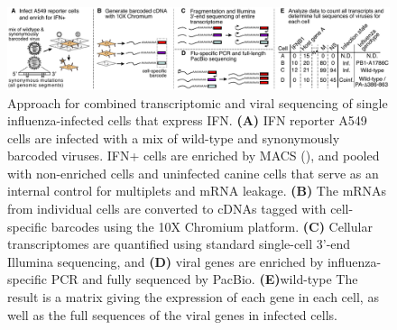 \documentclass[9pt,lineno]{elife}
\begin{document}
\begin{figure}
\begin{fullwidth}

\includegraphics[width=\linewidth, valign=t]{figures/WorkflowSchematic/SchematicForPaper.pdf}

\caption{
Approach for combined transcriptomic and viral sequencing of single influenza-infected cells that express IFN.
{\bf (A)}
IFN reporter A549 cells are infected with a mix of wild-type and synonymously barcoded viruses.
IFN+ cells are enriched by MACS (), and pooled with non-enriched cells and uninfected canine cells that serve as an internal control for multiplets and mRNA leakage.
{\bf (B)}
The mRNAs from individual cells are converted to cDNAs tagged with cell-specific barcodes using the 10X Chromium platform.
{\bf (C)}
Cellular transcriptomes are quantified using standard single-cell 3'-end Illumina sequencing, and 
{\bf (D)}
viral genes are enriched by influenza-specific PCR and fully sequenced by PacBio.
{\bf (E)}wild-type
The result is a matrix giving the expression of each gene in each cell, as well as the full sequences of the viral genes in infected cells.
}
\label{fig:workflow}


\end{fullwidth}
\end{figure}
\end{document}
